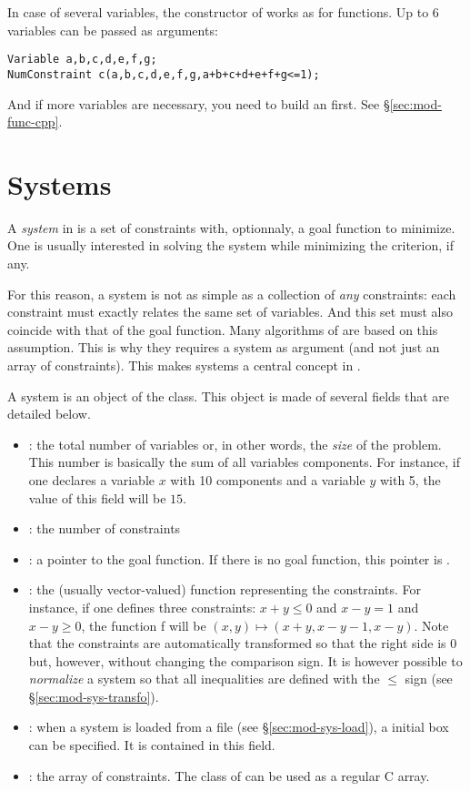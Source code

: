 In case of several variables, the constructor of  works as for functions.
Up to 6 variables can be passed as arguments:
\begin{lstlisting}
Variable a,b,c,d,e,f,g;
NumConstraint c(a,b,c,d,e,f,g,a+b+c+d+e+f+g<=1);
\end{lstlisting}	

And if more variables are necessary, you need to build an  first.
See \S\ref{sec:mod-func-cpp}.

\section{Systems}

A {\it system} in \ibex is a set of constraints with, optionnaly, a goal function to minimize.
One is usually interested in solving the system while minimizing the criterion, if any.

For this reason, a system is not as simple as a collection of {\it any} constraints:
each constraint must exactly relates the same set of variables. And this set must
also coincide with that of the goal function.
Many algorithms of \ibex are based on this assumption.
This is why they requires a system as argument (and not just an array of constraints).
This makes systems a central concept in \ibex.

A system is an object of the  class. This object is made of several fields
that are detailed below. %

\begin{itemize}
\item {} : the total number of variables or, in other words, the
{\it size} of the problem. This number is basically the sum of all variables components. For instance,
if one declares a variable $x$ with 10 components and a variable $y$ with 5, the value of this field
will be $15$.
\item {} : the number of constraints
\item {} : a pointer to the goal function. If there is no goal function, this
pointer is .
\item {} : the (usually vector-valued) function representing the constraints. 
For instance, if one defines three constraints: $x+y\leq0$ and $x-y=1$ and $x-y\geq0$, the function f will be 
$(x,y)\mapsto (x+y,x-y-1,x-y)$. Note that the constraints are automatically transformed so that the right side 
is 0 but, however, without changing the comparison sign. It is however possible to {\it normalize} a system so that
all inequalities are defined with the $\le$ sign (see \S\ref{sec:mod-sys-transfo}).
\item {} : when a system is loaded from a file (see \S\ref{sec:mod-sys-load}),
a initial box can be specified. It is contained in this field.
\item {} : the array of constraints. The  class of \ibex can
be used as a regular C array.
\end{itemize}

